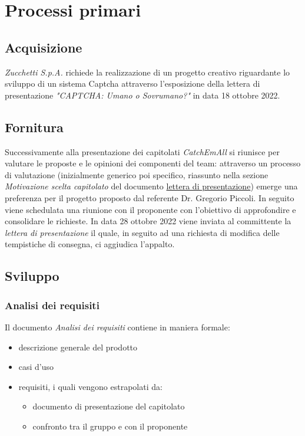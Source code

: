 \section{Processi primari}
\subsection{Acquisizione}
\textit{Zucchetti S.p.A.} richiede la realizzazione di un progetto creativo riguardante lo sviluppo di un sistema Captcha attraverso l'esposizione della lettera di presentazione \textit{"CAPTCHA: Umano o Sovrumano?"} in data 18 ottobre 2022.


\subsection{Fornitura}
Successivamente alla presentazione dei capitolati \textit{CatchEmAll} si riunisce per valutare le proposte e le opinioni dei componenti del team: attraverso un processo di valutazione (inizialmente generico poi specifico, riassunto nella sezione \textit{Motivazione scelta capitolato} del documento \href{https://github.com/catchEmAll-SWE/catchEmAll-Docs/blob/main/Assegnazione appalti/LetteraCandidatura.pdf}{lettera di presentazione}) emerge una preferenza per il progetto proposto dal referente Dr. Gregorio Piccoli.  
\newline
In seguito viene schedulata una riunione con il proponente con l'obiettivo di approfondire e consolidare le richieste. 
\newline
In data 28 ottobre 2022 viene inviata al committente la \textit{lettera di presentazione} il quale, in seguito ad una richiesta di modifica delle tempistiche di consegna, ci aggiudica l'appalto.

\subsection{Sviluppo}
    \subsubsection{Analisi dei requisiti}
    Il documento \textit{Analisi dei requisiti} contiene in maniera formale:
    \begin{itemize}
        \item descrizione generale del prodotto
        \item casi d'uso
        \item requisiti, i quali vengono estrapolati da:
        \begin{itemize}
            \item documento di presentazione del capitolato
            \item confronto tra il gruppo e con il proponente
        \end{itemize}
    \end{itemize} 
        
